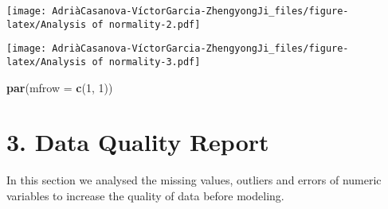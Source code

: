 \documentclass[
]{article}
\newenvironment{Shaded}{\begin{snugshade}}{\end{snugshade}}
\newcommand{\AttributeTok}[1]{\textcolor[rgb]{0.13,0.29,0.53}{#1}}
\newcommand{\ConstantTok}[1]{\textcolor[rgb]{0.56,0.35,0.01}{#1}}
\newcommand{\DecValTok}[1]{\textcolor[rgb]{0.00,0.00,0.81}{#1}}
\newcommand{\FloatTok}[1]{\textcolor[rgb]{0.00,0.00,0.81}{#1}}
\newcommand{\FunctionTok}[1]{\textcolor[rgb]{0.13,0.29,0.53}{\textbf{#1}}}
\newcommand{\NormalTok}[1]{#1}
\newcommand{\OtherTok}[1]{\textcolor[rgb]{0.56,0.35,0.01}{#1}}
\newcommand{\SpecialCharTok}[1]{\textcolor[rgb]{0.81,0.36,0.00}{\textbf{#1}}}
\newcommand{\StringTok}[1]{\textcolor[rgb]{0.31,0.60,0.02}{#1}}
\begin{document}
\texttt{[image: AdriàCasanova-VíctorGarcia-ZhengyongJi\_files/figure-latex/Analysis of normality-2.pdf]}

\begin{Shaded}
\end{Shaded}

\texttt{[image: AdriàCasanova-VíctorGarcia-ZhengyongJi\_files/figure-latex/Analysis of normality-3.pdf]}

\begin{Shaded}
\begin{Highlighting}[]
\FunctionTok{par}\NormalTok{(}\AttributeTok{mfrow =} \FunctionTok{c}\NormalTok{(}\DecValTok{1}\NormalTok{, }\DecValTok{1}\NormalTok{))}
\end{Highlighting}
\end{Shaded}

\hypertarget{data-quality-report}{%
\section{3. Data Quality Report}\label{data-quality-report}}

In this section we analysed the missing values, outliers and errors of
numeric variables to increase the quality of data before modeling.
\end{document}
